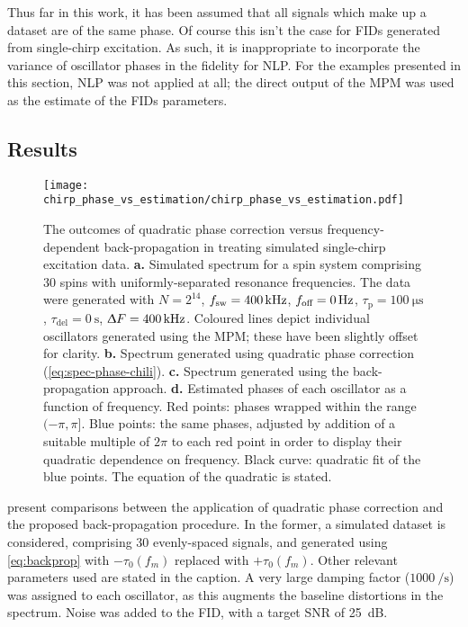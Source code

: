Thus far in this work, it has been assumed that all signals which make up a
dataset are of the same phase. Of course this isn't the case for \acp{FID}
generated from single-chirp excitation. As such, it is inappropriate to
incorporate the variance of oscillator phases in the fidelity for \ac{NLP}.
For the examples presented in this section, \ac{NLP} was not applied at all;
the direct output of the \ac{MPM} was used as the estimate of the \acp{FID}
parameters.

\subsection{Results}
\begin{figure}
    \centering
    \texttt{[image: chirp\_phase\_vs\_estimation/chirp\_phase\_vs\_estimation.pdf]}
    \caption[
        The outcomes of quadratic phase correction versus frequency-dependent
        back-propagation in treating simulated single-chirp excitation data.
    ]
    {
        The outcomes of quadratic phase correction versus frequency-dependent
        back-propagation in treating simulated single-chirp excitation data.
        \textbf{a.} Simulated spectrum for a spin system comprising 30 spins
        with uniformly-separated resonance frequencies. The data were generated
        with
        $N=2^{14}$,
        $f_{\mathrm{sw}}=\qty{400}{\kilo\hertz}$,
        $f_{\text{off}}=\qty{0}{\hertz}$,
        $\tau_{\text{p}} = \qty{100}{\micro\second}$,
        $\tau_{\text{del}} = \qty{0}{\second}$,
        $\Updelta F = \qty{400}{\kilo\hertz}$.
        Coloured lines depict individual oscillators generated using the
        \ac{MPM}; these have been slightly offset for clarity.
        \textbf{b.} Spectrum generated using quadratic phase correction
        (\cref{eq:spec-phase-chili}). \label{corr:baseline-dist}
        \textbf{c.} Spectrum generated using the back-propagation approach.
        \textbf{d.} Estimated phases of each oscillator as a function of
        frequency. Red points: phases wrapped within the range $(-\pi, \pi]$.
        Blue points: the same phases, adjusted by addition of a suitable multiple
        of $2 \pi$ to each red point in order to display their quadratic
        dependence on frequency.
        Black curve: quadratic fit of the blue points. The equation of the
        quadratic is stated.
    }
    \label{fig:bbqchili-sim}
\end{figure}
 present comparisons
between the application of quadratic phase correction and the proposed
back-propagation procedure. In the former, a simulated
dataset is considered, comprising 30 evenly-spaced signals, and generated using
\cref{eq:backprop} with $-\tau_0(f_m)$ replaced with $+\tau_0(f_m)$. Other
relevant parameters used are stated in the caption.
A very large damping factor ($\qty{1000}{\per\second}$) was assigned to each
oscillator, as this augments the baseline distortions in the spectrum.
Noise was added to the \ac{FID}, with a target \ac{SNR} of
\qty{25}{\deci\bel}.

